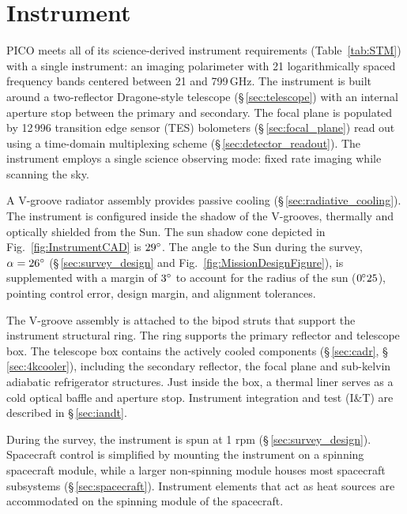 \newcommand\pdeg{.\!\!\degree}
\newcommand\parcm{.\!\!'}

\section{Instrument}
\label{sec:instrument} %

PICO meets all of its science-derived instrument requirements (Table~\ref{tab:STM})
with a single instrument: an imaging polarimeter with 21 logarithmically spaced frequency
bands centered between 21 and 799\,GHz. The instrument is built around
a two-reflector Dragone-style telescope
(\S\,\ref{sec:telescope}) with an internal aperture stop between the
primary and secondary. The focal plane is populated by 12\,996
transition edge sensor (TES) bolometers (\S\,\ref{sec:focal_plane})
read out using a time-domain multiplexing scheme
(\S\,\ref{sec:detector_readout}). The instrument employs a single
science observing mode: fixed rate imaging while scanning the
sky.


A V-groove radiator assembly provides passive cooling
(\S\,\ref{sec:radiative_cooling}). The instrument is configured inside
the shadow of the V-grooves, thermally and optically shielded from the
Sun. The sun shadow cone depicted in Fig.~\ref{fig:InstrumentCAD} is
$29^\circ$. The angle to the Sun during the survey, $\alpha = 26^\circ$
(\S\,\ref{sec:survey_design} and Fig.~\ref{fig:MissionDesignFigure}), is supplemented with a margin of
$3^\circ$ to account for the radius of the sun ($0\pdeg25$), pointing
control error, design margin, and alignment tolerances.

The V-groove assembly is attached to the bipod struts that support the
instrument structural ring. The ring supports the primary reflector
and telescope box. The telescope box contains the actively cooled
components (\S\,\ref{sec:cadr}, \S\,\ref{sec:4kcooler}), including
the secondary reflector, the focal plane and sub-kelvin adiabatic
refrigerator structures. Just inside the box, a thermal liner serves
as a cold optical baffle and aperture stop. Instrument integration and test (I\&T) are described in
\S\,\ref{sec:iandt}.

During the survey, the instrument is spun at 1 rpm
(\S\,\ref{sec:survey_design}). Spacecraft control is simplified by
mounting the instrument on a spinning spacecraft module, while a
larger non-spinning module houses most spacecraft subsystems
(\S\,\ref{sec:spacecraft}). Instrument elements that act as heat
sources are accommodated on the spinning module of the
spacecraft.



